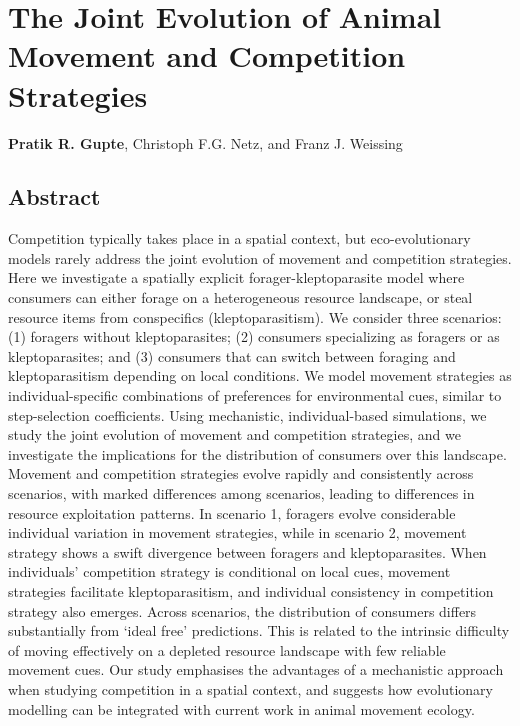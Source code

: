 \chapter{The Joint Evolution of Animal Movement and Competition Strategies}\label{ch:kleptomove}

{\noindent \sffamily\textbf{Pratik R. Gupte}, Christoph F.G. Netz, and Franz J. Weissing}

\section*{Abstract}

Competition typically takes place in a spatial context, but eco-evolutionary models rarely address the joint evolution of movement and competition strategies.
Here we investigate a spatially explicit forager-kleptoparasite model where consumers can either forage on a heterogeneous resource landscape, or steal resource items from conspecifics (kleptoparasitism). We consider three scenarios: (1) foragers without kleptoparasites; (2) consumers specializing as foragers or as kleptoparasites; and (3) consumers that can switch between foraging and kleptoparasitism depending on local conditions.
We model movement strategies as individual-specific combinations of preferences for environmental cues, similar to step-selection coefficients.
Using mechanistic, individual-based simulations, we study the joint evolution of movement and competition strategies, and we investigate the implications for the distribution of consumers over this landscape.
Movement and competition strategies evolve rapidly and consistently across scenarios, with marked differences among scenarios, leading to differences in resource exploitation patterns.
In scenario 1, foragers evolve considerable individual variation in movement strategies, while in scenario 2, movement strategy shows a swift divergence between foragers and kleptoparasites.
When individuals' competition strategy is conditional on local cues, movement strategies facilitate kleptoparasitism, and individual consistency in competition strategy also emerges.
Across scenarios, the distribution of consumers differs substantially from `ideal free' predictions.
This is related to the intrinsic difficulty of moving effectively on a depleted resource landscape with few reliable movement cues.
Our study emphasises the advantages of a mechanistic approach when studying competition in a spatial context, and suggests how evolutionary modelling can be integrated with current work in animal movement ecology.

